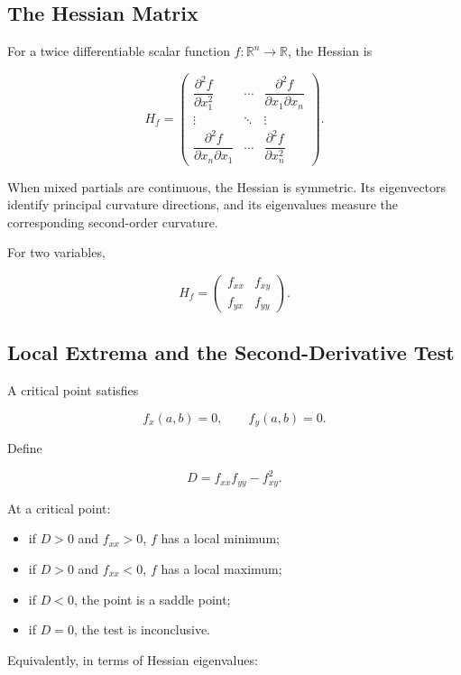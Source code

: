 \subsection{The Hessian Matrix}

For a twice differentiable scalar function $f:\mathbb R^n\to\mathbb R$, the Hessian is

\begin{equation}
\boxed{
H_f
=
\begin{pmatrix}
\dfrac{\partial^2f}{\partial x_1^2} & \cdots & \dfrac{\partial^2f}{\partial x_1\partial x_n}\\[6pt]
\vdots & \ddots & \vdots\\[6pt]
\dfrac{\partial^2f}{\partial x_n\partial x_1} & \cdots & \dfrac{\partial^2f}{\partial x_n^2}
\end{pmatrix}.
}
\label{eq:hessian}
\end{equation}

When mixed partials are continuous, the Hessian is symmetric. Its eigenvectors identify principal curvature directions, and its eigenvalues measure the corresponding second-order curvature.

For two variables,

\[
H_f
=
\begin{pmatrix}
f_{xx} & f_{xy}\\
f_{yx} & f_{yy}
\end{pmatrix}.
\]

\subsection{Local Extrema and the Second-Derivative Test}

A critical point satisfies

\[
f_x(a,b)=0,
\qquad
f_y(a,b)=0.
\]

Define

\[
D=f_{xx}f_{yy}-f_{xy}^2.
\]

At a critical point:

\begin{itemize}
\item if $D>0$ and $f_{xx}>0$, $f$ has a local minimum;
\item if $D>0$ and $f_{xx}<0$, $f$ has a local maximum;
\item if $D<0$, the point is a saddle point;
\item if $D=0$, the test is inconclusive.
\end{itemize}

Equivalently, in terms of Hessian eigenvalues:

